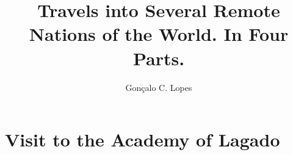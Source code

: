\documentclass[11pt,lot,lof,b5paper]{puthesis}
\title{Travels into Several Remote Nations of the World. In Four Parts.}
\author{Gonçalo C. Lopes}
\renewcommand{\maketitlepage}{}
\begin{document}
% 
% 



\maketitlepage
\makefrontmatter

\tableofcontents\clearpage


\chapter{Visit to the Academy of Lagado}


%
%


\singlespacing


\cleardoublepage
\ifdefined{}
\else

\fi




% 
% 

\end{document}
